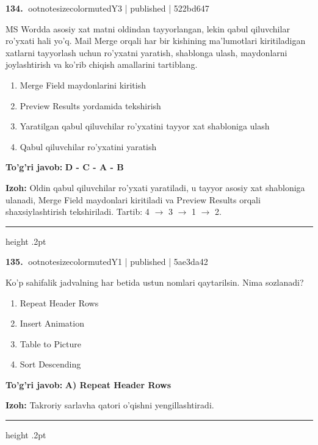 \documentclass[10pt,a4paper]{article}
\begin{document}
\textbf{\color{ink}134.} {ootnotesizecolor{muted}Y3 | published | 522bd647}
\par
MS Wordda asosiy xat matni oldindan tayyorlangan, lekin qabul qiluvchilar ro'yxati hali yo'q. Mail Merge orqali har bir kishining ma'lumotlari kiritiladigan xatlarni tayyorlash uchun ro'yxatni yaratish, shablonga ulash, maydonlarni joylashtirish va ko'rib chiqish amallarini tartiblang.
\begin{enumerate}[label=\Alph*),leftmargin=9mm]
\item Merge Field maydonlarini kiritish
\item Preview Results yordamida tekshirish
\item Yaratilgan qabul qiluvchilar ro'yxatini tayyor xat shabloniga ulash
\item Qabul qiluvchilar ro'yxatini yaratish
\end{enumerate}
\begin{tcolorbox}[enhanced,breakable,colback=teal!4,colframe=teal!55!black,boxrule=0.45pt,arc=1.2mm,left=2.8mm,right=2.8mm,top=2mm,bottom=2mm]
\textbf{\color{teal}To'g'ri javob:} \textbf{D - C - A - B}
\par\smallskip
\textbf{Izoh:} Oldin qabul qiluvchilar ro'yxati yaratiladi, u tayyor asosiy xat shabloniga ulanadi, Merge Field maydonlari kiritiladi va Preview Results orqali shaxsiylashtirish tekshiriladi. Tartib: 4 \ensuremath{\rightarrow} 3 \ensuremath{\rightarrow} 1 \ensuremath{\rightarrow} 2.
\end{tcolorbox}
\vspace{2mm}\hrule height .2pt\vspace{2mm}

\textbf{\color{ink}135.} {ootnotesizecolor{muted}Y1 | published | 5ae3da42}
\par
Ko'p sahifalik jadvalning har betida ustun nomlari qaytarilsin. Nima sozlanadi?
\begin{enumerate}[label=\Alph*),leftmargin=9mm]
\item Repeat Header Rows
\item Insert Animation
\item Table to Picture
\item Sort Descending
\end{enumerate}
\begin{tcolorbox}[enhanced,breakable,colback=teal!4,colframe=teal!55!black,boxrule=0.45pt,arc=1.2mm,left=2.8mm,right=2.8mm,top=2mm,bottom=2mm]
\textbf{\color{teal}To'g'ri javob:} \textbf{A) Repeat Header Rows}
\par\smallskip
\textbf{Izoh:} Takroriy sarlavha qatori o'qishni yengillashtiradi.
\end{tcolorbox}
\vspace{2mm}\hrule height .2pt\vspace{2mm}
\end{document}
